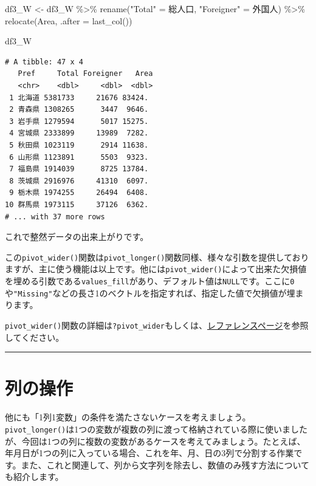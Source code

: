 \documentclass[
  a4paper,
  pandoc,
  ja=standard,
  jafont=haranoaji]{bxjsbook}
\newenvironment{Shaded}{\begin{snugshade}}{\end{snugshade}}
\newcommand{\AttributeTok}[1]{\textcolor[rgb]{0.00,0.48,0.65}{#1}}
\newcommand{\FunctionTok}[1]{\textcolor[rgb]{0.28,0.35,0.67}{#1}}
\newcommand{\NormalTok}[1]{\textcolor[rgb]{0.00,0.48,0.65}{#1}}
\newcommand{\OtherTok}[1]{\textcolor[rgb]{0.00,0.48,0.65}{#1}}
\newcommand{\SpecialCharTok}[1]{\textcolor[rgb]{0.37,0.37,0.37}{#1}}
\newcommand{\StringTok}[1]{\textcolor[rgb]{0.13,0.47,0.30}{#1}}
\begin{document}
\begin{Shaded}
\begin{Highlighting}[numbers=left,,]
\NormalTok{df3\_W }\OtherTok{\textless{}{-}}\NormalTok{ df3\_W }\SpecialCharTok{\%\textgreater{}\%}
  \FunctionTok{rename}\NormalTok{(}\StringTok{"Total"}     \OtherTok{=}\NormalTok{ 総人口,}
         \StringTok{"Foreigner"} \OtherTok{=}\NormalTok{ 外国人) }\SpecialCharTok{\%\textgreater{}\%}
  \FunctionTok{relocate}\NormalTok{(Area, }\AttributeTok{.after =} \FunctionTok{last\_col}\NormalTok{())}

\NormalTok{df3\_W}
\end{Highlighting}
\end{Shaded}

\begin{verbatim}
# A tibble: 47 x 4
   Pref     Total Foreigner   Area
   <chr>    <dbl>     <dbl>  <dbl>
 1 北海道 5381733     21676 83424.
 2 青森県 1308265      3447  9646.
 3 岩手県 1279594      5017 15275.
 4 宮城県 2333899     13989  7282.
 5 秋田県 1023119      2914 11638.
 6 山形県 1123891      5503  9323.
 7 福島県 1914039      8725 13784.
 8 茨城県 2916976     41310  6097.
 9 栃木県 1974255     26494  6408.
10 群馬県 1973115     37126  6362.
# ... with 37 more rows
\end{verbatim}

これで整然データの出来上がりです。

この\texttt{pivot\_wider()}関数は\texttt{pivot\_longer()}関数同様、様々な引数を提供しておりますが、主に使う機能は以上です。他には\texttt{pivot\_wider()}によって出来た欠損値を埋める引数である\texttt{values\_fill}があり、デフォルト値は\texttt{NULL}です。ここに\texttt{0}や\texttt{"Missing"}などの長さ1のベクトルを指定すれば、指定した値で欠損値が埋まります。

\texttt{pivot\_wider()}関数の詳細は\texttt{?pivot\_wider}もしくは、\href{https://tidyr.tidyverse.org/reference/pivot_wider.html}{レファレンスページ}を参照してください。

\begin{center}\rule{0.5\linewidth}{0.5pt}\end{center}

\hypertarget{sec-tidydata_separate}{%
\section{列の操作}\label{sec-tidydata_separate}}

他にも「1列1変数」の条件を満たさないケースを考えましょう。\texttt{pivot\_longer()}は1つの変数が複数の列に渡って格納されている際に使いましたが、今回は1つの列に複数の変数があるケースを考えてみましょう。たとえば、年月日が1つの列に入っている場合、これを年、月、日の3列で分割する作業です。また、これと関連して、列から文字列を除去し、数値のみ残す方法についても紹介します。
\end{document}
